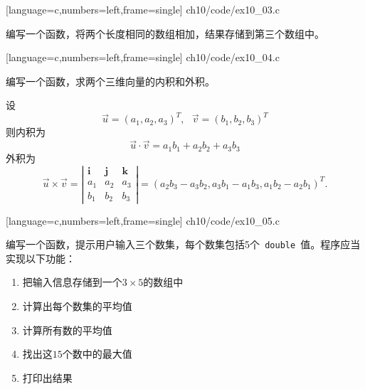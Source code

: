 \begin{frame}

[language=c,numbers=left,frame=single]
{ch10/code/ex10_03.c}
\end{frame}

 

\begin{frame}[fragile]\ft{\secname}
\begin{biancheng} 
编写一个函数，将两个长度相同的数组相加，结果存储到第三个数组中。
\end{biancheng}
\end{frame}

\begin{frame}\ft{\secname}

[language=c,numbers=left,frame=single]
{ch10/code/ex10_04.c}
\end{frame}


 


\begin{frame}[fragile]\ft{\secname}
\begin{biancheng} 
编写一个函数，求两个三维向量的内积和外积。
\end{biancheng}
设
$$
\vec u = (a_1,a_2,a_3)^T, ~~~ 
\vec v = (b_1,b_2,b_3)^T
$$
则内积为
$$
\vec u \cdot \vec v = a_1b_1+a_2b_2+a_3b_3
$$
外积为
$$
\vec u \times \vec v = 
\left|
\begin{array}{ccc}
\mathbf i & \mathbf j & \mathbf k \\
a_1 & a_2 & a_3 \\
b_1 & b_2 & b_3
\end{array}
\right| = (a_2b_3-a_3b_2, a_3b_1-a_1b_3, a_1b_2-a_2b_1)^T.
$$
\end{frame}

\begin{frame}\ft{\secname}

[language=c,numbers=left,frame=single]
{ch10/code/ex10_05.c}
\end{frame}



\begin{frame}[fragile]
\begin{biancheng} 
编写一个函数，提示用户输入三个数集，每个数集包括5个\lstinline| double |值。程序应当实现以下功能：
\begin{enumerate}
\item 把输入信息存储到一个$3\times5$的数组中
\item 计算出每个数集的平均值
\item 计算所有数的平均值
\item 找出这$15$个数中的最大值
\item 打印出结果
\end{enumerate}
\end{biancheng}
\end{frame}

